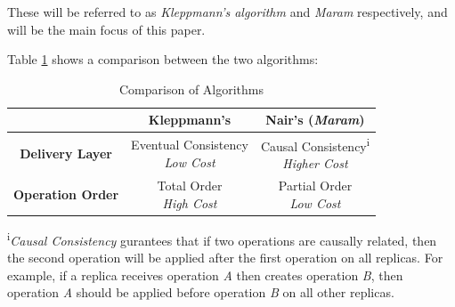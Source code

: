 \documentclass[12pt]{article}
\begin{document}
These will be referred to as \textit{Kleppmann's algorithm} and \textit{Maram} respectively, and will be the main focus of this paper.

Table \ref{table:differences} shows a comparison between the two algorithms:

\begin{table}[ht]
    \def\arraystretch{2}
    \caption{Comparison of Algorithms} %
    \centering %
    \begin{tabular}{c c c} %
        \hline\hline %
                                & \textbf{Kleppmann's \cite{9563274}} & \textbf{Nair's (\textit{Maram}) \cite{https://doi.org/10.48550/arxiv.2103.04828}} \\ [0.5ex] %
        \hline %
        \textbf{Delivery Layer} & \makecell{Eventual Consistency                                                                                          \\ \textit{Low Cost}} & \makecell{Causal Consistency\textsuperscript{i}  \\ \textit{Higher Cost}}  \\ %
        \textbf{Operation Order}     & \makecell{Total Order                                                                                                   \\ \textit{High Cost}} & \makecell{Partial Order \\ \textit{Low Cost}}

        \\ [1ex] %
        \hline %
    \end{tabular}
    \label{table:differences} %
\end{table}

\textsuperscript{i}\textit{Causal Consistency} gurantees that if two operations are causally related, then the second operation will be applied after the first operation on all replicas. For example, if a replica receives operation \textit{A} then creates operation \textit{B}, then operation \textit{A} should be applied before operation \textit{B} on all other replicas. \par
\end{document}
